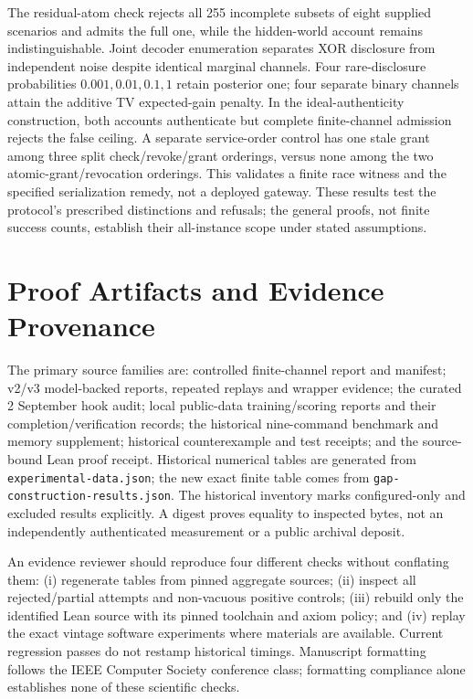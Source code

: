 \documentclass[conference,compsoc]{IEEEtran}
\newcommand{\code}[1]{\texttt{\small #1}}
\begin{document}
The residual-atom check rejects all 255 incomplete subsets of eight supplied
scenarios and admits the full one, while the hidden-world account remains
indistinguishable. Joint decoder enumeration separates XOR disclosure from
independent noise despite identical marginal channels. Four rare-disclosure
probabilities $0.001,0.01,0.1,1$ retain posterior one; four separate binary
channels attain the additive TV expected-gain penalty. In the ideal-authenticity
construction, both accounts authenticate but complete finite-channel admission
rejects the false ceiling. A separate service-order control has one stale grant
among three split check/revoke/grant orderings, versus none among the two
atomic-grant/revocation orderings. This validates a finite race witness and
the specified serialization remedy, not a deployed gateway. These results
test the protocol's prescribed
distinctions and refusals; the general proofs, not finite success counts,
establish their all-instance scope under stated assumptions.

\section{Proof Artifacts and Evidence Provenance}
\label{app:audit}
The primary source families are: controlled finite-channel report and manifest;
v2/v3 model-backed reports, repeated replays and wrapper evidence; the curated
2 September hook audit; local public-data training/scoring reports and their
completion/verification records; the historical nine-command benchmark and
memory supplement; historical counterexample and test receipts; and the
source-bound Lean proof receipt. Historical numerical tables are generated
from \code{experimental-data.json}; the new exact finite table comes from
\code{gap-construction-results.json}. The historical inventory marks configured-only and
excluded results explicitly. A digest proves equality to inspected bytes,
not an independently authenticated measurement or a public archival deposit.

An evidence reviewer should reproduce four different checks without conflating
them: (i) regenerate tables from pinned aggregate sources; (ii) inspect all
rejected/partial attempts and non-vacuous positive controls; (iii) rebuild only
the identified Lean source with its pinned toolchain and axiom policy; and
(iv) replay the exact vintage software experiments where materials are
available. Current regression passes do not restamp historical timings.
Manuscript formatting follows the IEEE Computer Society conference class;
formatting compliance alone establishes none of these scientific checks.
\end{document}
